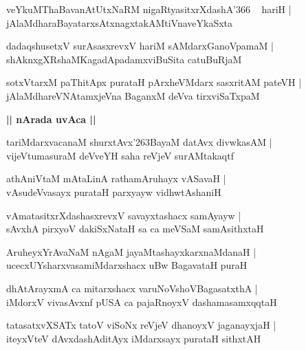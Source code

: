 \documentclass[twoside,12pt,openright]{book}
\def\S{\char'263}
\newcounter{shloka}[chapter]
\def\uvaca#1{\centerline{{\large\textbf{#1}}}}
\begin{document}
\begin{shloka}%
veYkuMThaBavanAtUtxNaRM nigaRtyasitxrXdashA\char'366 ~ hariH |\\
jAlaMdharaBayatarxsAtxnagxtakAMtiVnaveYkaSxta
\end{shloka}

\begin{shloka}%
dadaqshusetxV surAsasxrevxV hariM sAMdarxGanoVpamaM |\\
shAknxgXRshaMKagadApadamxviBuSita catuBuRjaM 
\end{shloka}

\begin{shloka}%
sotxVtarxM paThitApx purataH pArxheVMdarx sasxritAM pateVH |\\
jAlaMdhareVNAtamxjeVna BaganxM deVva tirxviSaTxpaM 
\end{shloka}

\uvaca{|| nArada uvAca ||}

\begin{shloka}%
tariMdarxvacanaM shurxtAvx\S BayaM datAvx divwkasAM |\\
vijeVtumasuraM deVveYH saha reVjeV surAMtakaqtf 
\end{shloka}

\begin{shloka}%
athAniVtaM mAtaLinA rathamAruhayx vASavaH |\\
vAsudeVvasayx purataH parxyayw vidhwtAshaniH
\end{shloka}

\begin{shloka}%
vAmatasitxrXdashasxrevxV savayxtashacx samAyayw |\\
sAvxhA pirxyoV dakiSxNataH sa ca meVSaM samAsithxtaH 
\end{shloka}

\begin{shloka}%
AruheyxYrAvaNaM nAgaM jayaMtashayxkarxnaMdanaH |\\
ucecxUYsharxvasamiMdarxshacx uBw BagavataH puraH 
\end{shloka}

\begin{shloka}%
dhAtArayxmA ca mitarxshacx varuNoVshoVBagasatxthA |\\
iMdorxV vivasAvxnf pUSA ca pajaRnoyxV dashamasamxqqtaH 
\end{shloka}

\begin{shloka}%
tatasatxvXSATx tatoV viSoNx reVjeV dhanoyxV jaganayxjaH |\\
iteyxVteV dAvxdashAditAyx iMdarxsayx purataH sithxtAH 
\end{shloka}
\end{document}
